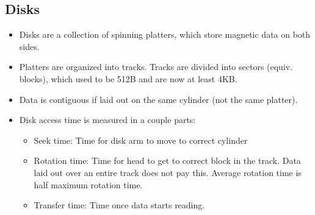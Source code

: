 \documentclass[12pt]{article}
\begin{document}
\subsection{Disks} 
\begin{itemize}
	\item Disks are a collection of spinning platters, which store magnetic data on both sides.
	\item Platters are organized into tracks. Tracks are divided into sectors (equiv. blocks), which used to be 512B and are now at least 4KB.
	\item Data is contiguous if laid out on the same cylinder (not the same platter). 
	\item Disk access time is measured in a couple parts:
		\begin{itemize}
			\item Seek time: Time for disk arm to move to correct cylinder
			\item Rotation time: Time for head to get to correct block in the track. Data laid out over an entire track does not pay this. Average rotation time is half maximum rotation time. 
			\item Transfer time: Time once data starts reading.
		\end{itemize}
\end{itemize}
\end{document}
